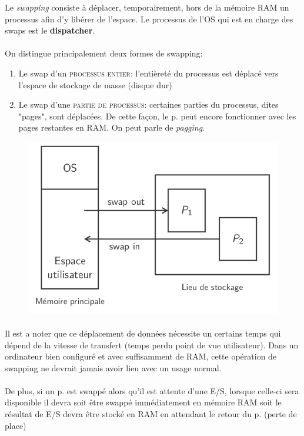 \item{}
{
Le \textit{swapping} consiste à déplacer, temporairement, hors de la mémoire RAM un processus afin d'y libérer de l'espace. Le processus de l'OS qui est en charge des swaps est le \textbf{dispatcher}.

\paragraph{}
On distingue principalement deux formes de swapping:
\begin{enumerate}
\item Le swap d'un \textsc{processus entier}: l'entièreté du processus est déplacé vers l'espace de stockage de masse (disque dur)
\item Le swap d'une \textsc{partie de processus}: certaines parties du processus, dites "pages", sont déplacées. De cette façon, le p. peut encore fonctionner avec les pages restantes en RAM. On peut parle de \textit{pagging}.
\end{enumerate}

\begin{figure}
\center\includegraphics[scale=.3]{images/swapping}
\end{figure}

\paragraph{}
Il est a noter que ce déplacement de données nécessite un certains temps qui dépend de la vitesse de transfert (temps perdu point de vue utilisateur). Dans un ordinateur bien configuré et avec suffisamment de RAM, cette opération de swapping ne devrait jamais avoir lieu avec un usage normal.
\paragraph{}
De plus, si un p. est swappé alors qu'il est attente d'une E/S, lorsque celle-ci sera disponible il devra soit être swappé immédiatement en mémoire RAM soit le résultat de E/S devra être stocké en RAM en attendant le retour du p. (perte de place)
}


